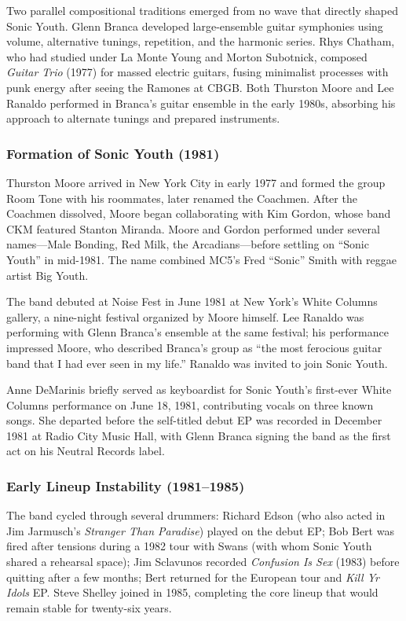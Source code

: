 \documentclass[11pt,letterpaper]{article}
\begin{document}
Two parallel compositional traditions emerged from no wave that directly shaped Sonic Youth. Glenn Branca developed large-ensemble guitar symphonies using volume, alternative tunings, repetition, and the harmonic series. Rhys Chatham, who had studied under La Monte Young and Morton Subotnick, composed \textit{Guitar Trio} (1977) for massed electric guitars, fusing minimalist processes with punk energy after seeing the Ramones at CBGB. Both Thurston Moore and Lee Ranaldo performed in Branca's guitar ensemble in the early 1980s, absorbing his approach to alternate tunings and prepared instruments.

\subsubsection{Formation of Sonic Youth (1981)}

Thurston Moore arrived in New York City in early 1977 and formed the group Room Tone with his roommates, later renamed the Coachmen. After the Coachmen dissolved, Moore began collaborating with Kim Gordon, whose band CKM featured Stanton Miranda. Moore and Gordon performed under several names---Male Bonding, Red Milk, the Arcadians---before settling on ``Sonic Youth'' in mid-1981. The name combined MC5's Fred ``Sonic'' Smith with reggae artist Big Youth.

The band debuted at Noise Fest in June 1981 at New York's White Columns gallery, a nine-night festival organized by Moore himself. Lee Ranaldo was performing with Glenn Branca's ensemble at the same festival; his performance impressed Moore, who described Branca's group as ``the most ferocious guitar band that I had ever seen in my life.'' Ranaldo was invited to join Sonic Youth.

Anne DeMarinis briefly served as keyboardist for Sonic Youth's first-ever White Columns performance on June 18, 1981, contributing vocals on three known songs. She departed before the self-titled debut EP was recorded in December 1981 at Radio City Music Hall, with Glenn Branca signing the band as the first act on his Neutral Records label.

\subsubsection{Early Lineup Instability (1981--1985)}

The band cycled through several drummers: Richard Edson (who also acted in Jim Jarmusch's \textit{Stranger Than Paradise}) played on the debut EP; Bob Bert was fired after tensions during a 1982 tour with Swans (with whom Sonic Youth shared a rehearsal space); Jim Sclavunos recorded \textit{Confusion Is Sex} (1983) before quitting after a few months; Bert returned for the European tour and \textit{Kill Yr Idols} EP. Steve Shelley joined in 1985, completing the core lineup that would remain stable for twenty-six years.
\end{document}

